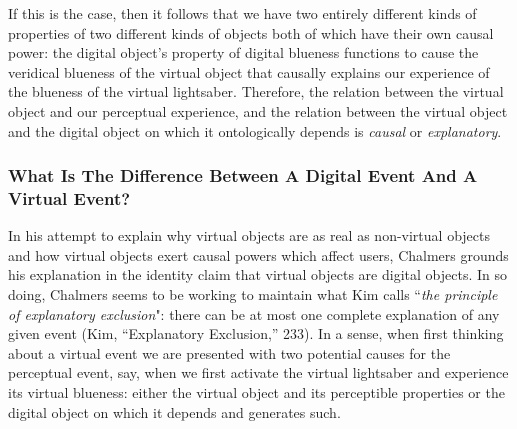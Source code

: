 \documentclass{article}
\begin{document}
If this is the case, then it follows that we have two entirely different kinds of properties of two different kinds of objects both of which have their own causal power: the digital object’s property of digital blueness functions to cause the veridical blueness of the virtual object that causally explains our experience of the blueness of the virtual lightsaber. Therefore, the relation between the virtual object and our perceptual experience, and the relation between the virtual object and the digital object on which it ontologically depends is \textit{causal} or \textit{explanatory}.

\subsubsection*{What Is The Difference Between A Digital Event And A Virtual Event?}

In his attempt to explain why virtual objects are as real as non-virtual objects and how virtual objects exert causal powers which affect users, Chalmers grounds his explanation in the identity claim that virtual objects are digital objects. In so doing, Chalmers seems to be working to maintain what Kim calls “\textit{the principle of explanatory exclusion}": there can be at most one complete explanation of any given event (Kim, “Explanatory Exclusion,” 233). In a sense, when first thinking about a virtual event we are presented with two potential causes for the perceptual event, say, when we first activate the virtual lightsaber and experience its virtual blueness: either the virtual object and its perceptible properties or the digital object on which it depends and generates such.
\end{document}
